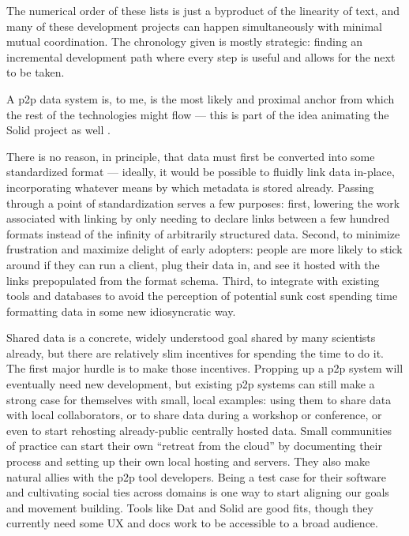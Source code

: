 \documentclass[10pt]{article}
\begin{document}
\begin{multicols}{2}
The numerical order of these lists is just a byproduct of the linearity
of text, and many of these development projects can happen
simultaneously with minimal mutual coordination. The chronology given is
mostly strategic: finding an incremental development path where every
step is useful and allows for the next to be taken.

A p2p data system is, to me, is the most likely and proximal anchor from
which the rest of the technologies might flow --- this is part of the
idea animating the Solid project as well \cite{berners-leeSociallyAwareCloud2009, finleyTimBernersLeeInventor2017, barabasDefendingInternetFreedom2017, sambraSolidPlatformDecentralized2016} .

There is no reason, in principle, that data must first be converted into
some standardized format --- ideally, it would be possible to fluidly
link data in-place, incorporating whatever means by which metadata is
stored already. Passing through a point of standardization serves a few
purposes: first, lowering the work associated with linking by only
needing to declare links between a few hundred formats instead of the
infinity of arbitrarily structured data. Second, to minimize frustration
and maximize delight of early adopters: people are more likely to stick
around if they can run a client, plug their data in, and see it hosted
with the links prepopulated from the format schema. Third, to integrate
with existing tools and databases to avoid the perception of potential
sunk cost spending time formatting data in some new idiosyncratic way.

Shared data is a concrete, widely understood goal shared by many
scientists already, but there are relatively slim incentives for
spending the time to do it. The first major hurdle is to make those
incentives. Propping up a p2p system will eventually need new
development, but existing p2p systems can still make a strong case for
themselves with small, local examples: using them to share data with
local collaborators, or to share data during a workshop or conference,
or even to start rehosting already-public centrally hosted data. Small
communities of practice can start their own ``retreat from the cloud''
by documenting their process and setting up their own local hosting and
servers. They also make natural allies with the p2p tool developers.
Being a test case for their software and cultivating social ties across
domains is one way to start aligning our goals and movement building.
Tools like Dat and Solid are good fits, though they currently need some
UX and docs work to be accessible to a broad audience.


\end{multicols}
\end{document}
